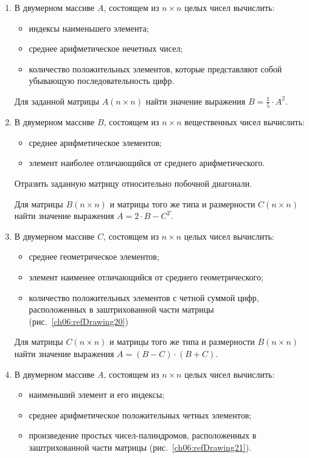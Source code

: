 \begin{enumerate}
\item В двумерном массиве $A$, состоящем из $n\times n$ целых чисел вычислить: 

\begin{itemize}
\item индексы наименьшего элемента;
\item среднее арифметическое нечетных чисел;
\item количество положительных элементов, которые представляют собой  убывающую последовательность цифр.
\end{itemize}

Для заданной матрицы $A(n\times n)$ найти значение выражения  $B=\frac{1}{5}\cdot A^2$.
\item В двумерном массиве $B$, состоящем из $n\times n$ вещественных чисел вычислить:
\begin{itemize}
\item среднее арифметическое элементов;
\item элемент наиболее отличающийся от среднего арифметического.
\end{itemize}

Отразить заданную матрицу относительно побочной диагонали.

Для матрицы $B(n\times n)$ и матрицы того же типа и размерности $C(n\times n)$
найти значение выражения  $A=2\cdot B-C^T$.
\item В двумерном массиве $C$, состоящем из $n\times n$ целых чисел вычислить:

\begin{itemize}
\item среднее геометрическое элементов;
\item элемент наименее отличающийся от среднего геометрического;
\item количество положительных элементов с четной суммой цифр, расположенных в заштрихованной 
части матрицы (рис.~\ref{ch06:refDrawing20})
\end{itemize}
Для матрицы $C(n\times n)$ и матрицы того же типа и размерности $B(n\times n)$
найти значение выражения  $A=(B-C)\cdot (B+C)$.


\item В двумерном массиве $A$, состоящем из $n\times n$ целых чисел вычислить:

\begin{itemize}
\item наименьший элемент и его индексы;
\item среднее арифметическое положительных четных элементов;
\item произведение простых чисел-палиндромов, расположенных в заштрихованной 
части матрицы (рис.~\ref{ch06:refDrawing21}).
\end{itemize}


\end{enumerate}
